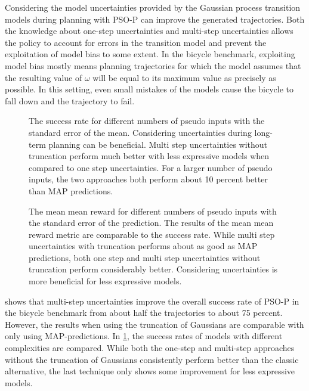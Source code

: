 Considering the model uncertainties provided by the Gaussian process transition models during planning with PSO-P can improve the generated trajectories.
Both the knowledge about one-step uncertainties and multi-step uncertainties allows the policy to account for errors in the transition model and prevent the exploitation of model bias to some extent.
In the bicycle benchmark, exploiting model bias mostly means planning trajectories for which the model assumes that the resulting value of $\omega$ will be equal to its maximum value as precisely as possible.
In this setting, even small mistakes of the models cause the bicycle to fall down and the trajectory to fail.

\begin{figure}[tp]
    \centering
    \caption[Success rates of all approaches] {
        The success rate for different numbers of pseudo inputs with the standard error of the mean.
        Considering uncertainties during long-term planning can be beneficial.
        Multi step uncertainties without truncation perform much better with less expressive models when compared to one step uncertainties.
        For a larger number of pseudo inputs, the two approaches both perform about 10 percent better than MAP predictions.
    }
    \label{fig:results_goal_percentage}
\end{figure}
\begin{figure}[tp]
    \centering
    \caption[Mean mean rewards of all approaches]{
        The mean mean reward for different numbers of pseudo inputs with the standard error of the prediction.
        The results of the mean mean reward metric are comparable to the success rate.
        While multi step uncertainties with truncation performs about as good as MAP predictions, both one step and multi step uncertainties without truncation perform considerably better.
        Considering uncertainties is more beneficial for less expressive models.
    }
    \label{fig:results_mean_mean_reward}
\end{figure}
 shows that multi-step uncertainties improve the overall success rate of PSO-P in the bicycle benchmark from about half the trajectories to about 75 percent.
However, the results when using the truncation of Gaussians are comparable with only using MAP-predictions.
In \cref{fig:results_goal_percentage}, the success rates of models with different complexities are compared.
While both the one-step and multi-step approaches without the truncation of Gaussians consistently perform better than the classic alternative, the last technique only shows some improvement for less expressive models.

